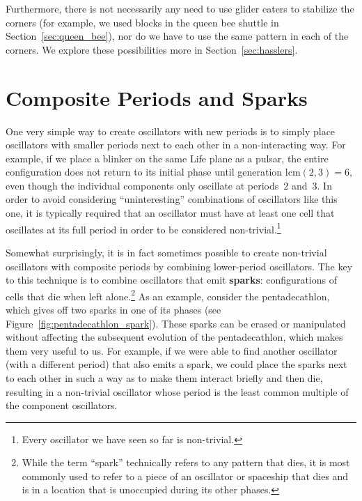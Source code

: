 Furthermore, there is not necessarily any need to use glider eaters to stabilize the corners (for example, we used blocks in the queen bee shuttle in Section~\ref{sec:queen_bee}), nor do we have to use the same pattern in each of the corners. We explore these possibilities more in Section~\ref{sec:hasslers}.


\section{Composite Periods and Sparks}\label{sec:composite_periods}

One very simple way to create oscillators with new periods is to simply place oscillators with smaller periods next to each other in a non-interacting way. For example, if we place a blinker on the same Life plane as a pulsar, the entire configuration does not return to its initial phase until generation $\mathrm{lcm}(2,3) = 6$, even though the individual components only oscillate at periods~$2$ and~$3$. In order to avoid considering ``uninteresting'' combinations of oscillators like this one, it is typically required that an oscillator must have at least one cell that oscillates at its full period in order to be considered non-trivial.\footnote{Every oscillator we have seen so far is non-trivial.}

Somewhat surprisingly, it is in fact sometimes possible to create non-trivial oscillators with composite periods by combining lower-period oscillators. The key to this technique is to combine oscillators that emit \textbf{sparks}: configurations of cells that die when left alone.\footnote{While the term ``spark'' technically refers to any pattern that dies, it is most commonly used to refer to a piece of an oscillator or spaceship that dies and is in a location that is unoccupied during its other phases.} As an example, consider the pentadecathlon, which gives off two sparks in one of its phases (see Figure~\ref{fig:pentadecathlon_spark}). These sparks can be erased or manipulated without affecting the subsequent evolution of the pentadecathlon, which makes them very useful to us. For example, if we were able to find another oscillator (with a different period) that also emits a spark, we could place the sparks next to each other in such a way as to make them interact briefly and then die, resulting in a non-trivial oscillator whose period is the least common multiple of the component oscillators.

